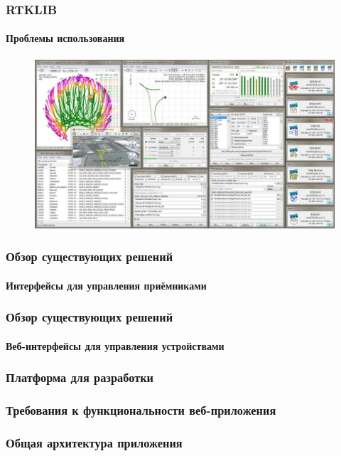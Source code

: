 \documentclass[xetex,t]{beamer}
\begin{document}
%
%
\begin{frame}
  \frametitle{RTKLIB}
  \framesubtitle{Проблемы использования}

  \begin{figure}[h]
    \centering
    \includegraphics[width=.95\textwidth]{../img/rtklib-hell}
  \end{figure}
\end{frame}


%
%


%
%
\begin{frame}
    \frametitle{Обзор существующих решений}
    \framesubtitle{Интерфейсы для управления приёмниками}
\end{frame}


%
%
\begin{frame}
  \frametitle{Обзор существующих решений}
  \framesubtitle{Веб-интерфейсы для управления устройствами}
\end{frame}


%
%
\begin{frame}
  \frametitle{Платформа для разработки}
\end{frame}


%
%
\begin{frame}
  \frametitle{Требования к функциональности веб-приложения}
\end{frame}


%
%
\begin{frame}
  \frametitle{Общая архитектура приложения}
\end{frame}
\end{document}
